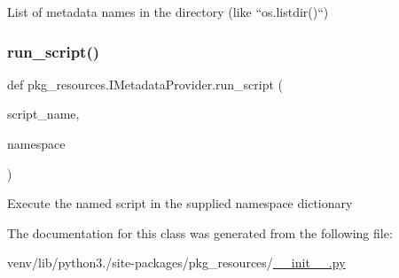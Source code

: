 \begin{DoxyVerb}List of metadata names in the directory (like ``os.listdir()``)\end{DoxyVerb}
 \mbox{\label{classpkg__resources_1_1IMetadataProvider_a8adadb1f0ba94514272df33f5ddda4d0}} 
\subsubsection{\texorpdfstring{run\+\_\+script()}{run\_script()}}
{\footnotesize\ttfamily def pkg\+\_\+resources.\+I\+Metadata\+Provider.\+run\+\_\+script (\begin{DoxyParamCaption}\item[{}]{script\+\_\+name,  }\item[{}]{namespace }\end{DoxyParamCaption})}

\begin{DoxyVerb}Execute the named script in the supplied namespace dictionary\end{DoxyVerb}
 

The documentation for this class was generated from the following file\+:\begin{DoxyCompactItemize}
\item 
venv/lib/python3./site-\/packages/pkg\+\_\+resources/\hyperlink{venv_2lib_2python3_89_2site-packages_2pkg__resources_2____init_____8py}{\+\_\+\+\_\+init\+\_\+\+\_\+.\+py}\end{DoxyCompactItemize}
